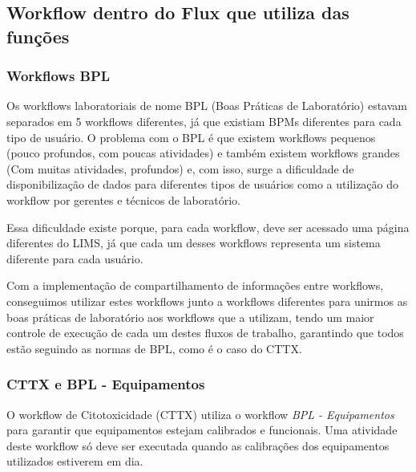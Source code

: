 \subsection{Workflow dentro do Flux que utiliza das funções}

\subsubsection{Workflows BPL}

Os workflows laboratoriais de nome BPL (Boas Práticas de Laboratório) estavam separados em 5 workflows diferentes, já que existiam BPMs diferentes para cada tipo de usuário.
O problema com o BPL é que existem workflows pequenos (pouco profundos, com poucas atividades) e também existem workflows grandes (Com muitas atividades, profundos) e, com isso, surge a dificuldade de disponibilização de dados para diferentes tipos de usuários como a utilização do workflow por gerentes e técnicos de laboratório.

Essa dificuldade existe porque, para cada workflow, deve ser acessado uma página diferentes do LIMS, já que cada um desses workflows representa um sistema diferente para cada usuário.

Com a implementação de compartilhamento de informações entre workflows, conseguimos utilizar estes workflows junto a workflows diferentes para unirmos as boas práticas de laboratório aos workflows que a utilizam, tendo um maior controle de execução de cada um destes fluxos de trabalho, garantindo que todos estão seguindo as normas de BPL, como é o caso do CTTX.


\subsubsection{CTTX e BPL - Equipamentos}

O workflow de Citotoxicidade (CTTX) utiliza o workflow \textit{BPL - Equipamentos} para garantir que equipamentos estejam calibrados e funcionais. Uma atividade deste workflow só deve ser executada quando as calibrações dos equipamentos utilizados estiverem em dia.

